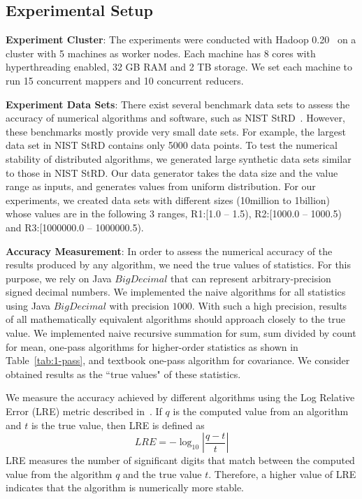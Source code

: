 \subsection{Experimental Setup}\label{sec:exp-setup}

\textbf{Experiment Cluster}: The experiments were conducted with Hadoop 0.20~\cite{hadoop} on a cluster with 5 machines as worker nodes. Each machine has 8 cores with hyperthreading enabled, 32 GB RAM and 2 TB storage. We set each machine to run 15 concurrent mappers and 10 concurrent reducers.

\textbf{Experiment Data Sets}: There exist several benchmark data sets to assess the accuracy of numerical algorithms and software, such as NIST StRD~\cite{nist}. However, these benchmarks mostly provide very small date sets. For example, the largest data set in NIST StRD contains only 5000 data points. To test the numerical stability of distributed algorithms, we generated large synthetic data sets similar to those in NIST StRD. Our data generator takes the data size and the value range as inputs, and generates values from uniform distribution. For our experiments, we created data sets with different sizes (10million to 1billion) whose values are in the following 3 ranges, R1:[1.0 -- 1.5), R2:[1000.0 -- 1000.5) and R3:[1000000.0 -- 1000000.5).

\textbf{Accuracy Measurement}: In order to assess the numerical accuracy of the results produced by any algorithm, we need the true values of statistics. For this purpose, we rely on Java $BigDecimal$ that can represent arbitrary-precision signed decimal numbers. We implemented the naive algorithms for all statistics using Java $BigDecimal$ with precision $1000$. With such a high precision, results of all mathematically equivalent algorithms should approach closely to the true value. We implemented naive recursive summation for sum, sum divided by count for mean, one-pass algorithms for higher-order statistics as shown in Table~\ref{tab:1-pass}, and textbook one-pass algorithm for covariance. We consider obtained results as the ``true values" of these statistics.

We measure the accuracy achieved by different algorithms using the Log Relative Error (LRE) metric described in~\cite{LRE}. If $q$ is the computed value from an algorithm and $t$ is the true value, then LRE is defined as $$LRE=-\log_{10}|\frac{q-t}{t}|$$
LRE measures the number of significant digits that match between the computed value from the algorithm $q$ and the true value $t$. Therefore, a higher value of LRE indicates that the algorithm is numerically more stable.

